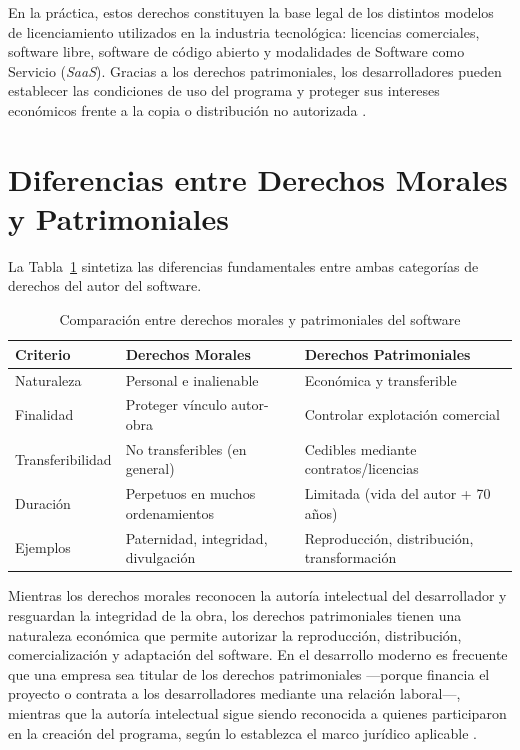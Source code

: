 \documentclass[11pt,a4paper]{report}
\begin{document}
En la práctica, estos derechos constituyen la base legal de los distintos modelos de licenciamiento utilizados en la industria tecnológica: licencias comerciales, software libre, software de código abierto y modalidades de Software como Servicio (\textit{SaaS}). Gracias a los derechos patrimoniales, los desarrolladores pueden establecer las condiciones de uso del programa y proteger sus intereses económicos frente a la copia o distribución no autorizada \citep{euipo2022}.

\section{Diferencias entre Derechos Morales y Patrimoniales}

La Tabla~\ref{tab:derechos} sintetiza las diferencias fundamentales entre ambas categorías de derechos del autor del software.

\begin{table}[H]
\centering
\caption{Comparación entre derechos morales y patrimoniales del software}
\label{tab:derechos}
\begin{tabularx}{\textwidth}{@{}lXX@{}}
\toprule
\textbf{Criterio} & \textbf{Derechos Morales} & \textbf{Derechos Patrimoniales} \\
\midrule
Naturaleza       & Personal e inalienable              & Económica y transferible \\
Finalidad        & Proteger vínculo autor-obra         & Controlar explotación comercial \\
Transferibilidad & No transferibles (en general)       & Cedibles mediante contratos/licencias \\
Duración         & Perpetuos en muchos ordenamientos   & Limitada (vida del autor + 70 años) \\
Ejemplos         & Paternidad, integridad, divulgación & Reproducción, distribución, transformación \\
\bottomrule
\end{tabularx}
\end{table}

Mientras los derechos morales reconocen la autoría intelectual del desarrollador y resguardan la integridad de la obra, los derechos patrimoniales tienen una naturaleza económica que permite autorizar la reproducción, distribución, comercialización y adaptación del software. En el desarrollo moderno es frecuente que una empresa sea titular de los derechos patrimoniales —porque financia el proyecto o contrata a los desarrolladores mediante una relación laboral—, mientras que la autoría intelectual sigue siendo reconocida a quienes participaron en la creación del programa, según lo establezca el marco jurídico aplicable \citep{ompi2024, indecopi2023}.
\end{document}
